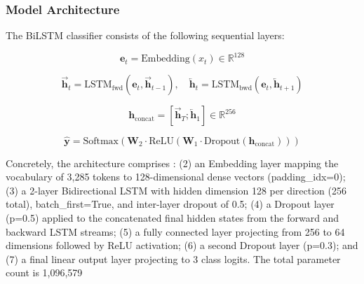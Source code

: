 \documentclass{article}
\begin{document}
\subsubsection{Model Architecture}
The BiLSTM classifier consists of the following sequential layers:

\begin{equation}
\label{eq:embedding}
\mathbf{e}_t = \text{Embedding}(x_t) \in \mathbb{R}^{128}
\end{equation}

\begin{equation}
\label{eq:bilstm}
\overrightarrow{\mathbf{h}}_t = \text{LSTM}_{\text{fwd}}(\mathbf{e}_t, \overrightarrow{\mathbf{h}}_{t-1}), \quad \overleftarrow{\mathbf{h}}_t = \text{LSTM}_{\text{bwd}}(\mathbf{e}_t, \overleftarrow{\mathbf{h}}_{t+1})
\end{equation}

\begin{equation}
\label{eq:concat}
\mathbf{h}_{\text{concat}} = [\overrightarrow{\mathbf{h}}_T ; \overleftarrow{\mathbf{h}}_1] \in \mathbb{R}^{256}
\end{equation}

\begin{equation}
\label{eq:classification}
\hat{\mathbf{y}} = \text{Softmax}(\mathbf{W}_2 \cdot \text{ReLU}(\mathbf{W}_1 \cdot \text{Dropout}(\mathbf{h}_{\text{concat}})))
\end{equation}

Concretely, the architecture comprises \cite{xu2019bilstm}: (2) an Embedding layer mapping the vocabulary of 3,285 tokens to 128-dimensional dense vectors (padding\_idx=0); (3) a 2-layer Bidirectional LSTM with hidden dimension 128 per direction (256 total), batch\_first=True, and inter-layer dropout of 0.5; (4) a Dropout layer (p=0.5) applied to the concatenated final hidden states from the forward and backward LSTM streams; (5) a fully connected layer projecting from 256 to 64 dimensions followed by ReLU activation; (6) a second Dropout layer (p=0.3); and (7) a final linear output layer projecting to 3 class logits. The total parameter count is 1,096,579
\end{document}
